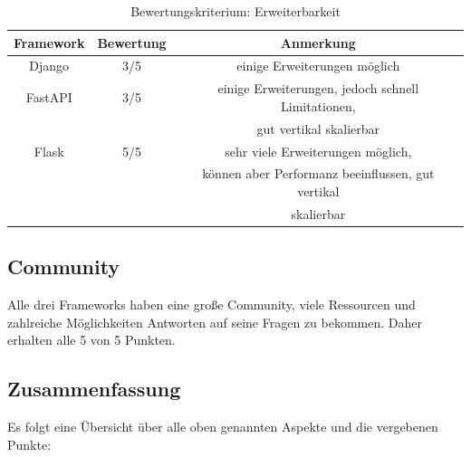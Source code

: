 \documentclass[letterpaper,11pt,leqno]{article}
\begin{document}
\begin{table}[h!]
	\begin{center}
		\begin{tabular}{|c||c|c|}
			\hline
			Framework & Bewertung & Anmerkung\\
			\hline\hline
			Django & 3/5 & einige Erweiterungen möglich\\
			FastAPI & 3/5 & einige Erweiterungen, jedoch schnell Limitationen,\\
			& & gut vertikal skalierbar\\
			Flask & 5/5 & sehr viele Erweiterungen möglich, \\
			& & können aber Performanz beeinflussen, gut vertikal\\
			& & skalierbar\\
			\hline
		\end{tabular}
		\caption{Bewertungskriterium: Erweiterbarkeit}
	\end{center}
	\label{table:9}
\end{table}

\subsection{Community}
Alle drei Frameworks haben eine große Community, viele Ressourcen und zahlreiche Möglichkeiten
Antworten auf seine Fragen zu bekommen. Daher erhalten alle 5 von 5 Punkten.

\subsection{Zusammenfassung}
Es folgt eine Übersicht über alle oben genannten Aspekte und die vergebenen Punkte:
\end{document}
